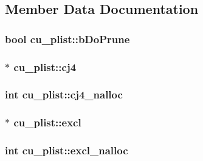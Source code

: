 \subsection{\-Member \-Data \-Documentation}
\hypertarget{structcu__plist_a016ba249a9cf8810627b3e8457e2fe82}{
\subsubsection[{b\-Do\-Prune}]{\setlength{\rightskip}{0pt plus 5cm}bool {\bf cu\-\_\-plist\-::b\-Do\-Prune}}}\label{structcu__plist_a016ba249a9cf8810627b3e8457e2fe82}
\hypertarget{structcu__plist_a858a7a5bafbd63c0dd5306aa08841101}{
\subsubsection[{cj4}]{$\ast$ {\bf cu\-\_\-plist\-::cj4}}}\label{structcu__plist_a858a7a5bafbd63c0dd5306aa08841101}
\hypertarget{structcu__plist_ad6e7a07acdc08375d8e99ea9ac122809}{
\subsubsection[{cj4\-\_\-nalloc}]{\setlength{\rightskip}{0pt plus 5cm}int {\bf cu\-\_\-plist\-::cj4\-\_\-nalloc}}}\label{structcu__plist_ad6e7a07acdc08375d8e99ea9ac122809}
\hypertarget{structcu__plist_a5e2f9a5ac82605cb77774a1898b01b72}{
\subsubsection[{excl}]{$\ast$ {\bf cu\-\_\-plist\-::excl}}}\label{structcu__plist_a5e2f9a5ac82605cb77774a1898b01b72}
\hypertarget{structcu__plist_a1d1ac80f9396bcc0541eb9d43b2510b2}{
\subsubsection[{excl\-\_\-nalloc}]{\setlength{\rightskip}{0pt plus 5cm}int {\bf cu\-\_\-plist\-::excl\-\_\-nalloc}}}\label{structcu__plist_a1d1ac80f9396bcc0541eb9d43b2510b2}
